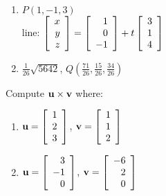 \begin{multicols}{2}
\begin{ex}
\begin{enumerate}[label={\alph*.}]
\item $P(1,-1,3) \quad $ \\ line: $ \left[
\begin{array}{r}
x\\
y\\
z
\end{array}
\right]
=
\left[
\begin{array}{r}
1\\
0\\
-1
\end{array}
\right]
+t
\left[
\begin{array}{r}
3\\
1\\
4
\end{array}
\right]
$

\end{enumerate}
\begin{sol}
\begin{enumerate}[label={\alph*.}]
\setcounter{enumi}{1}
\item  $\frac{1}{26}\sqrt{5642}$, $Q(\frac{71}{26}, \frac{15}{26}, \frac{34}{26})$


\end{enumerate}
\end{sol}
\end{ex}

\begin{ex}
Compute $\textbf{u} \times \textbf{v}$ where:


\begin{enumerate}[label={\alph*.}]
\item $\textbf{u} = \left[
\begin{array}{r}
1\\
2\\
3
\end{array}
\right]$, 
$\textbf{v} = \left[
\begin{array}{r}
1\\
1\\
2
\end{array}
\right]
$

\item $\textbf{u} = \left[
\begin{array}{r}
3\\
-1\\
0
\end{array}
\right]$, 
$\textbf{v} = \left[
\begin{array}{r}
-6\\
2\\
0
\end{array}
\right]
$


\end{enumerate}
\end{ex}
\end{multicols}
